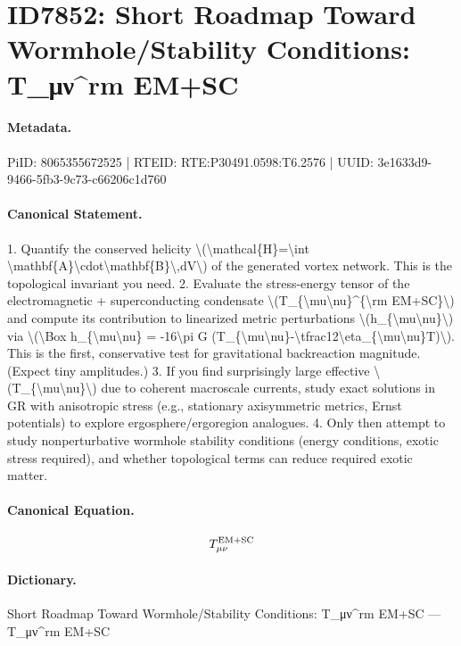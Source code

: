 \section*{ID7852: Short Roadmap Toward Wormhole/Stability Conditions: T\_μν\textasciicircum{}rm EM+SC}
\paragraph{Metadata.}
PiID: 8065355672525 | RTEID: RTE:P30491.0598:T6.2576 | UUID: 3e1633d9-9466-5fb3-9c73-c66206c1d760

\paragraph{Canonical Statement.}
1. Quantify the conserved helicity \textbackslash{}(\textbackslash{}mathcal\{H\}=\textbackslash{}int \textbackslash{}mathbf\{A\}\textbackslash{}cdot\textbackslash{}mathbf\{B\}\textbackslash{},dV\textbackslash{}) of the generated vortex network. This is the topological invariant you need. 2. Evaluate the stress-energy tensor of the electromagnetic + superconducting condensate \textbackslash{}(T\_\{\textbackslash{}mu\textbackslash{}nu\}\textasciicircum{}\{\textbackslash{}rm EM+SC\}\textbackslash{}) and compute its contribution to linearized metric perturbations \textbackslash{}(h\_\{\textbackslash{}mu\textbackslash{}nu\}\textbackslash{}) via \textbackslash{}(\textbackslash{}Box h\_\{\textbackslash{}mu\textbackslash{}nu\} = -16\textbackslash{}pi G (T\_\{\textbackslash{}mu\textbackslash{}nu\}-\textbackslash{}tfrac12\textbackslash{}eta\_\{\textbackslash{}mu\textbackslash{}nu\}T)\textbackslash{}). This is the first, conservative test for gravitational backreaction magnitude. (Expect tiny amplitudes.) 3. If you find surprisingly large effective \textbackslash{}(T\_\{\textbackslash{}mu\textbackslash{}nu\}\textbackslash{}) due to coherent macroscale currents, study exact solutions in GR with anisotropic stress (e.g., stationary axisymmetric metrics, Ernst potentials) to explore ergosphere/ergoregion analogues. 4. Only then attempt to study nonperturbative wormhole stability conditions (energy conditions, exotic stress required), and whether topological terms can reduce required exotic matter.

\paragraph{Canonical Equation.}
\[
T_{\mu\nu}^{\rm EM+SC}
\]

\paragraph{Dictionary.}
Short Roadmap Toward Wormhole/Stability Conditions: T\_μν\textasciicircum{}rm EM+SC — T\_μν\textasciicircum{}rm EM+SC

